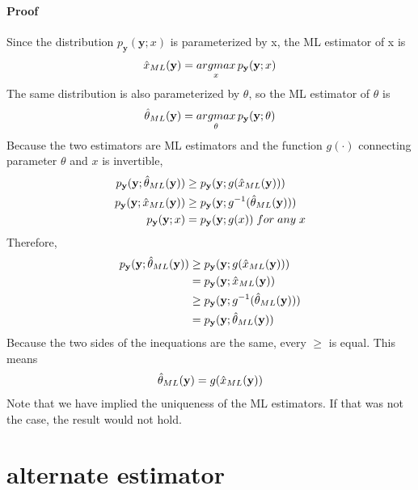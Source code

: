 \documentclass{article}
\begin{document}
\paragraph{Proof}
Since the distribution $p_{\mathbf{y}}(\mathbf{y};x)$ is parameterized by x, the ML estimator of x is
\begin{align}
	\hat{x}_{ML}(\mathbf{y})=\mathop{argmax}_x p_{\mathbf{y}}(\mathbf{y};x)\notag
\end{align}
The same distribution is also parameterized by $\theta$, so the ML estimator of $\theta$ is
\begin{align}
	\hat{\theta}_{ML}(\mathbf{y})=\mathop{argmax}_{\theta} p_{\mathbf{y}}(\mathbf{y};\theta)\notag
\end{align}
Because the two estimators are ML estimators and the function $g(\cdot)$ connecting parameter $\theta$ and $x$ is invertible, 
\begin{align}
	p_{\mathbf{y}}(\mathbf{y};\hat{\theta}_{ML}(\mathbf{y}))&\ge p_{\mathbf{y}}(\mathbf{y};g(\hat{x}_{ML}(\mathbf{y})))\notag\\
	p_{\mathbf{y}}(\mathbf{y};\hat{x}_{ML}(\mathbf{y}))&\ge p_{\mathbf{y}}(\mathbf{y};g^{-1}(\hat{\theta}_{ML}(\mathbf{y})))\notag\\
	p_{\mathbf{y}}(\mathbf{y};x)&=p_{\mathbf{y}}(\mathbf{y};g(x))\; for\; any\; x\notag
\end{align}
Therefore,
\begin{align}
	p_{\mathbf{y}}(\mathbf{y};\hat{\theta}_{ML}(\mathbf{y}))&\ge p_{\mathbf{y}}(\mathbf{y};g(\hat{x}_{ML}(\mathbf{y})))\notag\\
	&=p_{\mathbf{y}}(\mathbf{y};\hat{x}_{ML}(\mathbf{y}))\notag\\
	&\ge p_{\mathbf{y}}(\mathbf{y};g^{-1}(\hat{\theta}_{ML}(\mathbf{y})))\notag\\
	&=p_{\mathbf{y}}(\mathbf{y};\hat{\theta}_{ML}(\mathbf{y}))\notag
\end{align}
Because the two sides of the inequations are the same, every $\ge$ is equal. This means
\begin{align}
	\hat{\theta}_{ML}(\mathbf{y})=g(\hat{x}_{ML}(\mathbf{y}))\notag
\end{align}
Note that we have implied the uniqueness of the ML estimators. If that was not the case, the result would not hold.

\section{alternate estimator}
\end{document}
